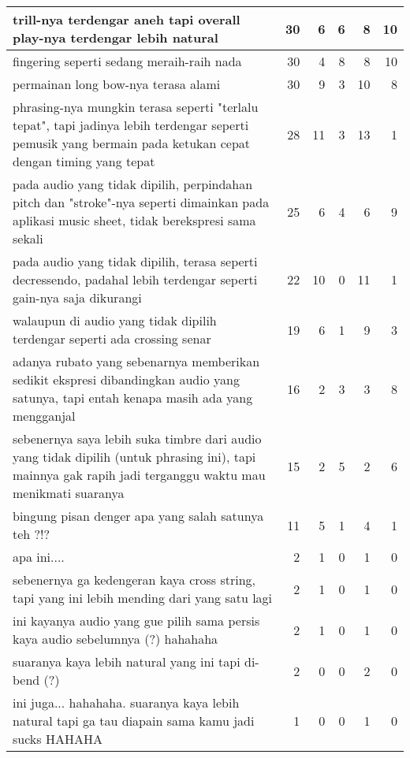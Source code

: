\begin{longtable}{|p{}|r|r|r|r|r|}
trill-nya terdengar aneh tapi overall play-nya terdengar lebih natural&	30&	6&	6&	8&	10\\\hline
fingering seperti sedang meraih-raih nada&	30&	4&	8&	8&	10\\\hline
permainan long bow-nya terasa alami&	30&	9&	3&	10&	8\\\hline
phrasing-nya mungkin terasa seperti "terlalu tepat", tapi jadinya lebih terdengar seperti pemusik yang bermain pada ketukan cepat dengan timing yang tepat&	28&	11&	3&	13&	1\\\hline
pada audio yang tidak dipilih, perpindahan pitch dan "stroke"-nya seperti dimainkan pada aplikasi music sheet, tidak berekspresi sama sekali&	25&	6&	4&	6&	9\\\hline
pada audio yang tidak dipilih, terasa seperti decressendo, padahal lebih terdengar seperti gain-nya saja dikurangi&	22&	10&	0&	11&	1\\\hline
walaupun di audio yang tidak dipilih terdengar seperti ada crossing senar&	19&	6&	1&	9&	3\\\hline
adanya rubato yang sebenarnya memberikan sedikit ekspresi dibandingkan audio yang satunya, tapi entah kenapa masih ada yang mengganjal&	16&	2&	3&	3&	8\\\hline
sebenernya saya lebih suka timbre dari audio yang tidak dipilih (untuk phrasing ini), tapi mainnya gak rapih jadi terganggu waktu mau menikmati suaranya&	15&	2&	5&	2&	6\\\hline
bingung pisan denger apa yang salah satunya teh ?!?&	11&	5&	1&	4&	1\\\hline
apa ini....&	2&	1&	0&	1&	0\\\hline
sebenernya ga kedengeran kaya cross string, tapi yang ini lebih mending dari yang satu lagi&	2&	1&	0&	1&	0\\\hline
ini kayanya audio yang gue pilih sama persis kaya audio sebelumnya (?) hahahaha&	2&	1&	0&	1&	0\\\hline
suaranya kaya lebih natural yang ini tapi di-bend (?)&	2&	0&	0&	2&	0\\\hline
ini juga... hahahaha. suaranya kaya lebih natural tapi ga tau diapain sama kamu jadi sucks HAHAHA&	1&	0&	0&	1&	0\\\hline

	\end{longtable}
